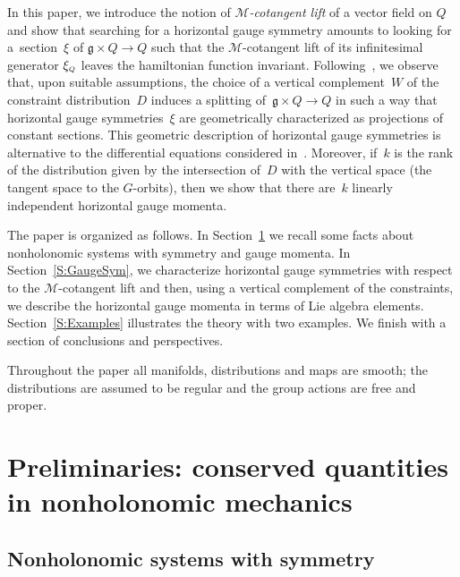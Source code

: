 \documentclass[10pt,a4paper]{amsart}
\numberwithin{equation}{section}
\def\M{\mathcal{M}}
\def\g{\mathfrak{g}}
\def\subQQ{{\mbox{\tiny{$Q$}}}}
\begin{document}
In this paper, we introduce the notion of {\it $\M$-cotangent lift} of a vector f\/ield
on $Q$ and show that searching for a horizontal gauge symmetry amounts to
looking for a~section~$\xi$ of $\g\times Q \to Q$  such that the $\M$-cotangent
lift of its inf\/initesimal generator $\xi_\subQQ$ leaves the hamiltonian function invariant.
Following~\cite{Paula}, we observe  that, upon suitable assumptions,  the choice
of a vertical complement~$W$ of the constraint distribution~$D$ induces
a splitting of~$\g\times Q \to Q$ in such a way that horizontal gauge symmetries~$\xi$ are geometrically characterized as projections of constant sections.
This geometric description of  horizontal gauge symmetries is alternative
to the dif\/ferential equations considered in~\cite{BGMConservation, FSG2008}.
Moreover, if~$k$ is the rank of the distribution given by the intersection of~$D$ with the vertical space (the tangent space to the $G$-orbits), then
we show that there are~$k$ linearly independent horizontal gauge momenta.

The paper is organized as follows. In Section~\ref{S:Preliminaries} we recall
some facts about nonholonomic systems with symmetry and gauge momenta.
In Section~\ref{S:GaugeSym}, we characterize horizontal gauge symmetries
with respect to the $\M$-cotangent lift and then, using a vertical complement
of the constraints, we describe the horizontal gauge momenta in terms of Lie
algebra elements. Section~\ref{S:Examples} illustrates the theory with two
examples. We f\/inish with a section of conclusions and perspectives.

Throughout the paper all manifolds, distributions and maps are smooth; the distributions
are assumed to be regular and the group actions are free and proper.

\section[Preliminaries: conserved quantities in nonholonomic mechanics]{Preliminaries: conserved quantities\\ in nonholonomic mechanics} \label{S:Preliminaries}

\subsection{Nonholonomic systems with symmetry}\label{Ss:NH}
\end{document}
